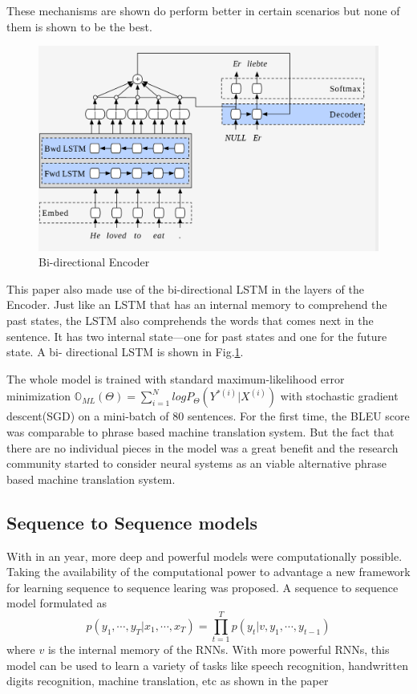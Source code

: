 \documentclass[a4paper]{article}
\begin{document}
These mechanisms  are shown  do perform better  in certain scenarios but none of
them is shown to be the best.


\begin{figure}
  \includegraphics[width=0.9\linewidth]{img/birnn.png}
  \caption{Bi-directional Encoder}
  \label{fig:birnn}
\end{figure}


This paper  also made  use of  the  bi-directional  LSTM  in  the layers  of the
Encoder. Just like  an  LSTM that has an internal memory to comprehend  the past
states, the LSTM also comprehends the words that comes next in the sentence.  It
has two internal state---one for past states and one for the future state. A bi-
directional LSTM is shown in Fig.\ref{fig:birnn}.

The whole model is trained with standard maximum-likelihood  error  minimization
$\mathbb{O}_{ML}(\Theta) = \sum_{i=1}^N log P_\Theta(Y^{*(i)} |  X^{(i)}) $ with
stochastic gradient  descent(SGD) on a mini-batch of 80 sentences. For the first
time, the BLEU score was comparable to phrase based machine  translation system.
But  the fact  that there  are  no  individual pieces  in the  model was a great
benefit and the  research  community started to  consider  neural systems as  an
viable alternative phrase based machine translation system.


\subsection{Sequence  to Sequence models}

\label{sec:seq}  With  in  an  year,  more   deep   and   powerful  models  were
computationally possible. Taking the availability of the computational power  to
advantage  a  new  framework  for  learning  sequence  to sequence  learing was
proposed. A sequence to sequence model formulated as $$ p(y_1, \cdots, y_T| x_1,
\cdots, x_T) =  \prod_{t=1}^{T} p(y_t| v, y_1,  \cdots,  y_{t-1})$$ where $v$ is
the internal memory of the RNNs. With more powerful RNNs, this model can be used
to  learn a  variety  of  tasks  like  speech  recognition,  handwritten  digits
recognition,   machine   translation,    etc    as   shown    in    the    paper
\cite{sutskever2014sequence}
\end{document}
